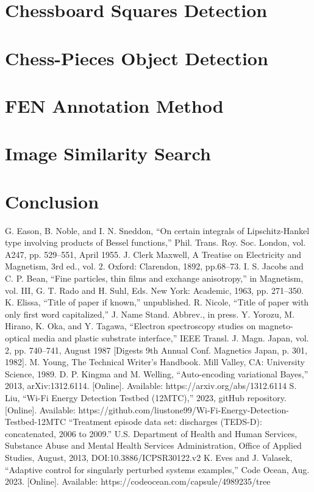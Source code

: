 \documentclass[conference]{IEEEtran}
\begin{document}
\section{Chessboard Squares Detection}

\section{Chess-Pieces Object Detection}

\section{FEN Annotation Method}

\section{Image Similarity Search}
\section{Conclusion}



\begin{thebibliography}{00}
 G. Eason, B. Noble, and I. N. Sneddon, ``On certain integrals of Lipschitz-Hankel type involving products of Bessel functions,'' Phil. Trans. Roy. Soc. London, vol. A247, pp. 529--551, April 1955.
 J. Clerk Maxwell, A Treatise on Electricity and Magnetism, 3rd ed., vol. 2. Oxford: Clarendon, 1892, pp.68--73.
 I. S. Jacobs and C. P. Bean, ``Fine particles, thin films and exchange anisotropy,'' in Magnetism, vol. III, G. T. Rado and H. Suhl, Eds. New York: Academic, 1963, pp. 271--350.
 K. Elissa, ``Title of paper if known,'' unpublished.
 R. Nicole, ``Title of paper with only first word capitalized,'' J. Name Stand. Abbrev., in press.
 Y. Yorozu, M. Hirano, K. Oka, and Y. Tagawa, ``Electron spectroscopy studies on magneto-optical media and plastic substrate interface,'' IEEE Transl. J. Magn. Japan, vol. 2, pp. 740--741, August 1987 [Digests 9th Annual Conf. Magnetics Japan, p. 301, 1982].
 M. Young, The Technical Writer's Handbook. Mill Valley, CA: University Science, 1989.
 D. P. Kingma and M. Welling, ``Auto-encoding variational Bayes,'' 2013, arXiv:1312.6114. [Online]. Available: https://arxiv.org/abs/1312.6114
 S. Liu, ``Wi-Fi Energy Detection Testbed (12MTC),'' 2023, gitHub repository. [Online]. Available: https://github.com/liustone99/Wi-Fi-Energy-Detection-Testbed-12MTC
 ``Treatment episode data set: discharges (TEDS-D): concatenated, 2006 to 2009.'' U.S. Department of Health and Human Services, Substance Abuse and Mental Health Services Administration, Office of Applied Studies, August, 2013, DOI:10.3886/ICPSR30122.v2
 K. Eves and J. Valasek, ``Adaptive control for singularly perturbed systems examples,'' Code Ocean, Aug. 2023. [Online]. Available: https://codeocean.com/capsule/4989235/tree
\end{thebibliography}
\end{document}

